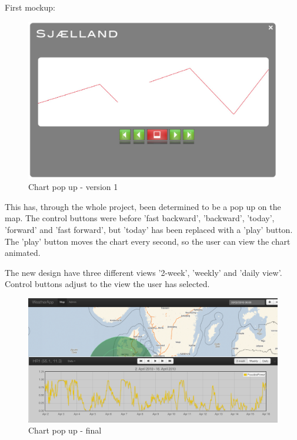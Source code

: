 First mockup: 
\begin{figure}[htbp]
   \centering
   \includegraphics[scale=.3]{figure/design_chart_v1.eps}
   \caption{Chart pop up - version 1}
\end{figure}

This has, through the whole project, been determined to be a pop up on the map.
The control buttons were before 'fast backward', 'backward', 'today', 'forward' and 'fast forward', but 'today' has been replaced with a 'play' button. The 'play' button moves the chart every second, so the user can view the chart animated.

The new design have three different views '2-week', 'weekly' and 'daily view'. Control buttons adjust to the view the user has selected.

\begin{figure}[htbp]
   \centering
   \includegraphics[scale=.3]{figure/design_chart_final.eps}
   \caption{Chart pop up - final}
\end{figure}